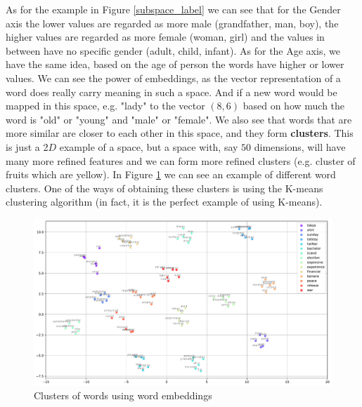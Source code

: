 \documentclass[12pt]{article}
\numberwithin{equation}{section}
\begin{document}
\begin{spacing}{1.5}
	As for the example in Figure \ref{subspace_label} we can see that for the Gender axis the lower values are regarded as more male (grandfather, man, boy), the higher values are regarded as more female (woman, girl) and the values in between have no specific gender (adult, child, infant). As for the Age axis, we have the same idea, based on the age of person the words have higher or lower values. We can see the power of embeddings, as the vector representation of a word does really carry meaning in such a space. And if a new word would be mapped in this space, e.g. "lady" to the vector $(8, 6)$ based on how much the word is "old" or "young" and "male" or "female". We also see that words that are more similar are closer to each other in this space, and they form \textbf{clusters}. This is just a 2$D$ example of a space, but a space with, say $50$ dimensions, will have many more refined features and we can form more refined clusters (e.g. cluster of fruits which are yellow). In Figure \ref{cluster} we can see an example of different word clusters. One of the ways of obtaining these clusters is using the K-means clustering algorithm (in fact, it is the perfect example of using K-means). 
	\begin{figure}[H]
		\centering

		\includegraphics[scale=0.50]{clusters}		
		\caption{Clusters of words using word embeddings}
		\label{cluster}
	\end{figure}
	

\end{spacing}
\end{document}
